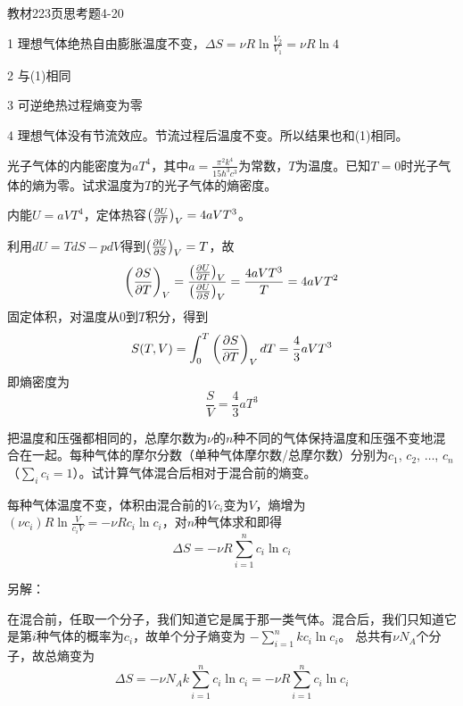 \documentclass[CJK]{beamer}
\begin{document}
\begin{frame}
  \bch
  教材223页思考题4-20
  \ech
\end{frame}


\begin{frame}
  \bch
  \bitem
\item[1]{理想气体绝热自由膨胀温度不变，$\Delta S = \nu R \ln\frac{V_2}{V_1} = \nu R \ln 4$}
\item[2]{与(1)相同}
\item[3]{可逆绝热过程熵变为零}
\item[4]{理想气体没有节流效应。节流过程后温度不变。所以结果也和(1)相同。}
  \eitem
  \ech
\end{frame}

\begin{frame}
\bch
光子气体的内能密度为$aT^4$，其中$a=\frac{\pi^2 k^4}{15\hbar^3c^3}$为常数，$T$为温度。已知$T=0$时光子气体的熵为零。试求温度为$T$的光子气体的熵密度。
\ech
\end{frame}

\begin{frame}
  \bch
内能$U=aVT^4$，定体热容$\left(\frac{\partial U}{\partial T}\right)_{V} = 4aVT^3$。

利用$dU = TdS - p dV$得到$\left(\frac{\partial U}{\partial S}\right)_{V} = T$，故
$$\left(\frac{\partial S}{\partial T}\right)_{V} = \frac{\left(\frac{\partial U}{\partial T}\right)_{V}}{\left(\frac{\partial U}{\partial S}\right)_{V}} = \frac{4aVT^3}{T} = 4aVT^2$$
固定体积，对温度从$0$到$T$积分，得到
$$ S(T, V) = \int_0^T \left(\frac{\partial S}{\partial T}\right)_{V} dT = \frac{4}{3}aVT^3 $$
即熵密度为
$$ \frac{S}{V}= \frac{4}{3}aT^3$$
\ech
\end{frame}

\begin{frame}
\bch
把温度和压强都相同的，总摩尔数为$\nu$的$n$种不同的气体保持温度和压强不变地混合在一起。每种气体的摩尔分数（单种气体摩尔数/总摩尔数）分别为$c_1$, $c_2$, $\ldots$, $c_n$ （$\sum_i c_i = 1$）。试计算气体混合后相对于混合前的熵变。
\ech
\end{frame}

\begin{frame}
  \bch
{\small
每种气体温度不变，体积由混合前的$Vc_i$变为$V$，熵增为$(\nu c_i) R\ln \frac{V}{c_iV} = - \nu R c_i\ln c_i$，对$n$种气体求和即得
$$\Delta S =   -\nu R \sum_{i=1}^n c_i \ln c_i$$}

\skipline

{\scriptsize
另解：

在混合前，任取一个分子，我们知道它是属于那一类气体。混合后，我们只知道它是第$i$种气体的概率为$c_i$，故单个分子熵变为
$-\sum_{i=1}^{n} kc_i\ln c_i $。 总共有$ \nu N_A $个分子，故总熵变为
$$ \Delta S =  -\nu N_A k\sum_{i=1}^n c_i \ln c_i = -\nu R \sum_{i=1}^n c_i \ln c_i$$  
}
\ech
\end{frame}
\end{document}
